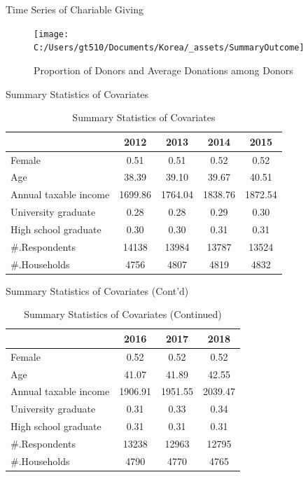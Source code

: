 \documentclass[
  ignorenonframetext,
]{beamer}
\begin{document}
\begin{frame}{Time Series of Chariable Giving}
\protect\hypertarget{time-series-of-chariable-giving}{}

\begin{figure}
\texttt{[image: C:/Users/gt510/Documents/Korea/\_assets/SummaryOutcome]} \caption{Proportion of Donors and Average Donations among Donors}\label{fig:unnamed-chunk-1}
\end{figure}

\end{frame}

\begin{frame}{Summary Statistics of Covariates}
\protect\hypertarget{summary-statistics-of-covariates}{}

\begin{table}

\caption{\label{tab:kableSummaryCovariate}Summary Statistics of Covariates}
\centering
\begin{tabular}[t]{lcccc}
\toprule
 & 2012 & 2013 & 2014 & 2015\\
\midrule
Female & 0.51 & 0.51 & 0.52 & 0.52\\
Age & 38.39 & 39.10 & 39.67 & 40.51\\
Annual taxable income & 1699.86 & 1764.04 & 1838.76 & 1872.54\\
University graduate & 0.28 & 0.28 & 0.29 & 0.30\\
High school graduate & 0.30 & 0.30 & 0.31 & 0.31\\
\#.Respondents & 14138 & 13984 & 13787 & 13524\\
\#.Households & 4756 & 4807 & 4819 & 4832\\
\bottomrule
\end{tabular}
\end{table}

\end{frame}

\begin{frame}{Summary Statistics of Covariates (Cont'd)}
\protect\hypertarget{summary-statistics-of-covariates-contd}{}

\begin{table}

\caption{\label{tab:kableSummaryCovariate2}Summary Statistics of Covariates (Continued)}
\centering
\begin{tabular}[t]{lccc}
\toprule
 & 2016 & 2017 & 2018\\
\midrule
Female & 0.52 & 0.52 & 0.52\\
Age & 41.07 & 41.89 & 42.55\\
Annual taxable income & 1906.91 & 1951.55 & 2039.47\\
University graduate & 0.31 & 0.33 & 0.34\\
High school graduate & 0.31 & 0.31 & 0.31\\
\#.Respondents & 13238 & 12963 & 12795\\
\#.Households & 4790 & 4770 & 4765\\
\bottomrule
\end{tabular}
\end{table}

\end{frame}
\end{document}
